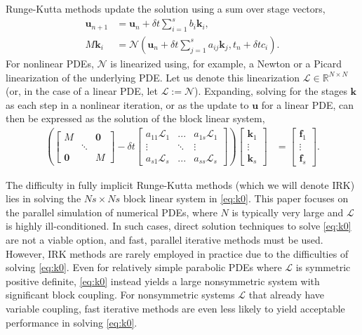\documentclass[review]{siamart}
\begin{document}
Runge-Kutta methods update the solution using a sum over stage vectors,
%
\begin{align}\label{eq:update}
\mathbf{u}_{n+1} & = \mathbf{u}_n + \delta t \sum_{i=1}^s b_i\mathbf{k}_i, \\
M\mathbf{k}_i & = \mathcal{N}\left(\mathbf{u}_n + \delta t\sum_{j=1}^s a_{ij}\mathbf{k}_j, t_n+\delta tc_i\right).\label{eq:stages}
\end{align}
%
For nonlinear PDEs, $\mathcal{N}$ is linearized using, for example, a Newton or a Picard
linearization of the underlying PDE. Let us denote this linearization
${\mathcal{L}}\in\mathbb{R}^{N\times N}$
(or, in the case of a linear PDE, let $\mathcal{L} := \mathcal{N}$).
Expanding, solving for the stages $\mathbf{k}$ as each step in a nonlinear iteration, or
as the update to $\mathbf{u}$ for a linear PDE, can then be expressed as the
solution of the block linear system,
%
\begin{align}\label{eq:k0}
\left( \begin{bmatrix} M  & & \mathbf{0} \\ & \ddots \\ \mathbf{0} & & M\end{bmatrix}
	- \delta t \begin{bmatrix} a_{11}\mathcal{L}_1 & ... & a_{1s}\mathcal{L}_1 \\
	\vdots & \ddots & \vdots \\ a_{s1}\mathcal{L}_s & ... & a_{ss} \mathcal{L}_s \end{bmatrix} \right)
	\begin{bmatrix} \mathbf{k}_1 \\ \vdots \\ \mathbf{k}_s \end{bmatrix} 
& = \begin{bmatrix} \mathbf{f}_1 \\ \vdots \\ \mathbf{f}_s \end{bmatrix}.
\end{align}
%

The difficulty in fully implicit Runge-Kutta methods (which we will denote IRK) lies in
solving the $Ns\times Ns$ block linear system in \eqref{eq:k0}. This paper focuses on the
parallel simulation of numerical PDEs, where $N$ is typically very large
and $\mathcal{L}$ is highly ill-conditioned. In such cases, direct
solution techniques to solve \eqref{eq:k0} are not a viable option, and fast, parallel 
iterative methods must be used. However, IRK methods are rarely employed in practice due
to the difficulties of solving \eqref{eq:k0}. Even for relatively simple
parabolic PDEs where $\mathcal{L}$ is symmetric positive definite, \eqref{eq:k0}
instead yields a large nonsymmetric system with significant block coupling. For
nonsymmetric systems $\mathcal{L}$ that already have variable coupling, fast iterative
methods are even less likely to yield acceptable performance in solving \eqref{eq:k0}.
\end{document}
